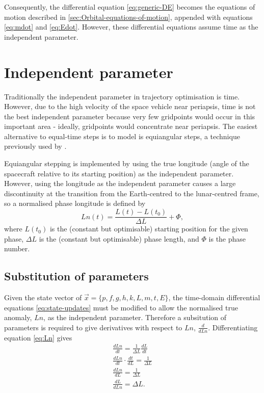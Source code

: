 Consequently, the differential equation \eqref{eq:generic-DE} becomes the equations of motion described in \autoref{sec:Orbital-equations-of-motion}, appended with equations \eqref{eq:mdot} and \eqref{eq:Edot}. However, these differential equations assume time as the independent parameter.

\section{Independent parameter} \label{sec:Independent-parameter}

Traditionally the independent parameter in trajectory optimisation is time. However, due to the high velocity of the space vehicle near periapsis, time is not the best independent parameter because very few gridpoints would occur in this important area - ideally, gridpoints would concentrate near periapsis. The easiest alternative to equal-time steps is to model is equiangular steps, a technique previously used by \textcite{Betts2003}. 

Equiangular stepping is implemented by using the true longitude (angle of the spacecraft relative to its starting position) as the independent parameter. However, using the longitude as the independent parameter causes a large discontinuity at the transition from the Earth-centred to the lunar-centred frame, so a normalised phase longitude is defined by
\begin{equation}
Ln(t) = \frac{L(t)-L(t_0)}{\Delta L}+\Phi \label{eq:Ln},
\end{equation}
where $L(t_0)$ is the (constant but optimisable) starting position for the given phase, $\Delta L$ is the (constant but optimisable) phase length, and $\Phi$ is the phase number. 

\subsection{Substitution of parameters}\label{sub:subst-param}

Given the state vector of $\vec{x}=\{p,f,g,h,k,L,m,t,E\}$, the time-domain differential equations \eqref{eq:state-updates} must be modified to allow the normalised true anomaly, $Ln$, as the independent parameter. Therefore a subsitution of parameters is required to give derivatives with respect to $Ln$, $\frac{d}{dLn}$. Differentiating equation \eqref{eq:Ln} gives
\begin{subequations} \label{eq:dLndt}
\begin{gather}
\frac{dLn}{dt}=\frac{1}{\Delta L}\frac{dL}{dt} \\
\frac{dLn}{dt}\cdot\frac{dt}{dL}=\frac{1}{\Delta L} \\
\frac{dLn}{dL}=\frac{1}{\Delta L} \\
\frac{dL}{dLn}=\Delta L.
\end{gather}
\end{subequations}

